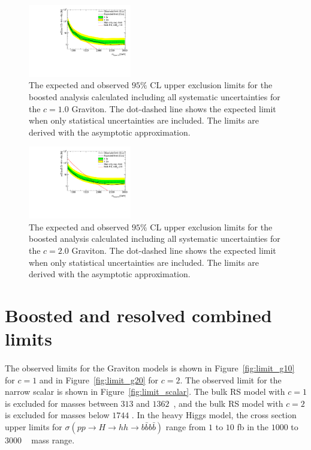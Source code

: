 \begin{figure}
\begin{center}
\includegraphics[width=0.4\textwidth,angle=-90]{figures/boosted/results/limit_boosted_boosted_okt18_g10.pdf}
\caption{The expected and observed $95\%$ CL upper exclusion limits for the boosted analysis calculated including all systematic uncertainties for the $c=1.0$ Graviton. The dot-dashed line shows the expected limit when only statistical uncertainties are included. The limits are derived with the asymptotic approximation.}
\label{fig:limit_boosted_g20}
\end{center}
\end{figure}
\begin{figure}

\begin{center}
\includegraphics[width=0.4\textwidth,angle=-90]{figures/boosted/results/limit_boosted_boosted_okt18_g20.pdf}
\caption{The expected and observed $95\%$ CL upper exclusion limits for the boosted analysis calculated including all systematic uncertainties for the $c=2.0$ Graviton. The dot-dashed line shows the expected limit when only statistical uncertainties are included. The limits are derived with the asymptotic approximation.}
\label{fig:limit_boosted_scalar}
\end{center}
\end{figure}


\section{Boosted and resolved combined limits}
\label{sec:combinedlimits}
\paragraph{}
The observed limits for the Graviton models is shown in Figure~\ref{fig:limit_g10} for $c = 1$ and in Figure~\ref{fig:limit_g20} for $c = 2$.
The observed limit for the narrow scalar is shown in Figure~\ref{fig:limit_scalar}.
The bulk RS model with $c = 1$ is excluded for masses between $313$ and $1362$~\GeV, and the bulk RS model with $c = 2$ is excluded for masses below $1744$ \GeV. 
In the heavy Higgs model, the cross section upper limits for $\sigma(pp \to H \to hh \to b\bar{b}b\bar{b})$ range from $1$ to $10$ fb in the $1000$ to $3000$ \GeV~ mass range.

